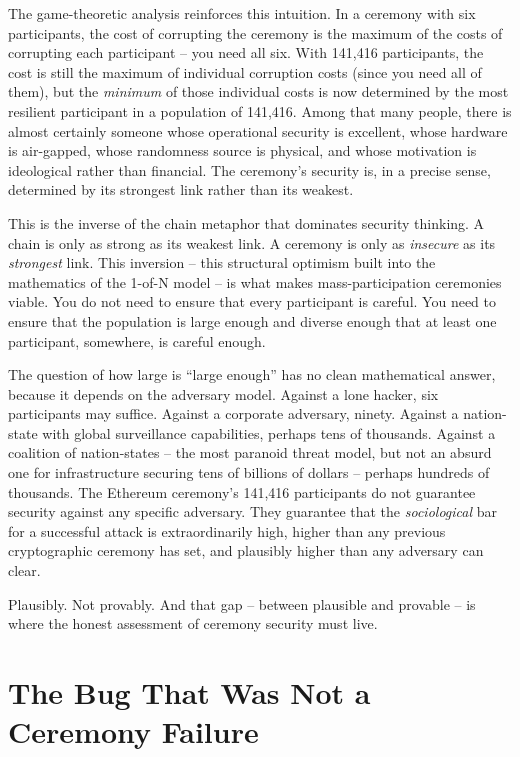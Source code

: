 \documentclass[
  11pt,
  openany]{report}
\begin{document}
The game-theoretic analysis reinforces this intuition. In a ceremony with six
participants, the cost of corrupting the ceremony is the maximum of the costs of
corrupting each participant -- you need all six. With 141,416 participants, the
cost is still the maximum of individual corruption costs (since you need all of
them), but the \emph{minimum} of those individual costs is now determined by the
most resilient participant in a population of 141,416. Among that many people,
there is almost certainly someone whose operational security is excellent, whose
hardware is air-gapped, whose randomness source is physical, and whose
motivation is ideological rather than financial. The ceremony's security is, in
a precise sense, determined by its strongest link rather than its weakest.

This is the inverse of the chain metaphor that dominates security thinking. A
chain is only as strong as its weakest link. A ceremony is only as
\emph{insecure} as its \emph{strongest} link. This inversion -- this structural
optimism built into the mathematics of the 1-of-N model -- is what makes
mass-participation ceremonies viable. You do not need to ensure that every
participant is careful. You need to ensure that the population is large enough
and diverse enough that at least one participant, somewhere, is careful enough.

The question of how large is ``large enough'' has no clean mathematical answer,
because it depends on the adversary model. Against a lone hacker, six
participants may suffice. Against a corporate adversary, ninety. Against a
nation-state with global surveillance capabilities, perhaps tens of thousands.
Against a coalition of nation-states -- the most paranoid threat model, but not
an absurd one for infrastructure securing tens of billions of dollars -- perhaps
hundreds of thousands. The Ethereum ceremony's 141,416 participants do not
guarantee security against any specific adversary. They guarantee that the
\emph{sociological} bar for a successful attack is extraordinarily high, higher
than any previous cryptographic ceremony has set, and plausibly higher than any
adversary can clear.

Plausibly. Not provably. And that gap -- between plausible and provable -- is
where the honest assessment of ceremony security must live.

\section{The Bug That Was Not a Ceremony
Failure}\label{the-bug-that-was-not-a-ceremony-failure}
\end{document}
